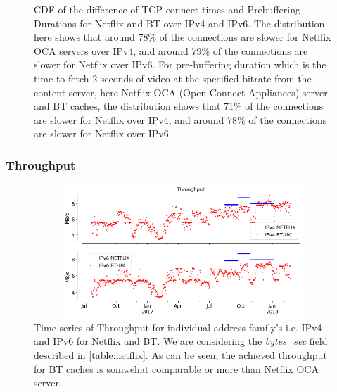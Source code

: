 \begin{figure}
\begin{minipage}{0.5\textwidth}
	\end{minipage}
	\caption[BT-UK Connect Time and Prebuffering Duration CDF Deltas]{CDF of the difference of TCP connect times and Prebuffering Durations for Netflix and BT over IPv4 and IPv6. The distribution here shows that around 78\% of the connections are slower for Netflix OCA servers over IPv4, and around 79\% of the connections are slower for Netflix over IPv6. 
For pre-buffering duration which is the time to fetch 2 seconds of video at the specified bitrate from the content server, here Netflix OCA (Open Connect Appliances) server and BT caches,
the distribution shows that 71\% of the connections are slower for Netflix over IPv4, and around 78\% of the connections are slower for Netflix over IPv6.}
	\label{fig:BT-UK Connect Time and Prebuffering Duration CDF Deltas}
\end{figure}

\FloatBarrier

\subsubsection*{Throughput}

\begin{figure}[!ht]
	\centering
	\includegraphics[keepaspectratio, height=5cm, width=15cm]{figures/cache/btuk/netflix-throughput-timeseries-asn-2856-separate.png}
	\caption[BT-UK Throughput Timeseries Absolute]{Time series of Throughput for individual address family's i.e. IPv4 and IPv6 for Netflix and BT. We are considering 
	the \textit{bytes\_sec} field described in \cref{table:netflix}. As can be seen, the achieved throughput for BT caches is somwehat comparable or more than Netflix OCA server.}
	\label{fig:BT-UK Throughput Timeseries Absolute}
\end{figure}

